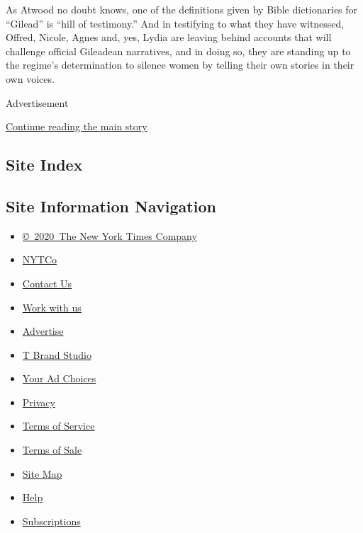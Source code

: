 As Atwood no doubt knows, one of the definitions given by Bible
dictionaries for ``Gilead'' is ``hill of testimony.'' And in testifying
to what they have witnessed, Offred, Nicole, Agnes and, yes, Lydia are
leaving behind accounts that will challenge official Gileadean
narratives, and in doing so, they are standing up to the regime's
determination to silence women by telling their own stories in their own
voices.

Advertisement

\protect\hyperlink{after-bottom}{Continue reading the main story}

\hypertarget{site-index}{%
\subsection{Site Index}\label{site-index}}

\hypertarget{site-information-navigation}{%
\subsection{Site Information
Navigation}\label{site-information-navigation}}

\begin{itemize}
\tightlist
\item
  \href{https://help.nytimes.com/hc/en-us/articles/115014792127-Copyright-notice}{©~2020~The
  New York Times Company}
\end{itemize}

\begin{itemize}
\tightlist
\item
  \href{https://www.nytco.com/}{NYTCo}
\item
  \href{https://help.nytimes.com/hc/en-us/articles/115015385887-Contact-Us}{Contact
  Us}
\item
  \href{https://www.nytco.com/careers/}{Work with us}
\item
  \href{https://nytmediakit.com/}{Advertise}
\item
  \href{http://www.tbrandstudio.com/}{T Brand Studio}
\item
  \href{https://www.nytimes.com/privacy/cookie-policy\#how-do-i-manage-trackers}{Your
  Ad Choices}
\item
  \href{https://www.nytimes.com/privacy}{Privacy}
\item
  \href{https://help.nytimes.com/hc/en-us/articles/115014893428-Terms-of-service}{Terms
  of Service}
\item
  \href{https://help.nytimes.com/hc/en-us/articles/115014893968-Terms-of-sale}{Terms
  of Sale}
\item
  \href{https://spiderbites.nytimes.com}{Site Map}
\item
  \href{https://help.nytimes.com/hc/en-us}{Help}
\item
  \href{https://www.nytimes.com/subscription?campaignId=37WXW}{Subscriptions}
\end{itemize}
